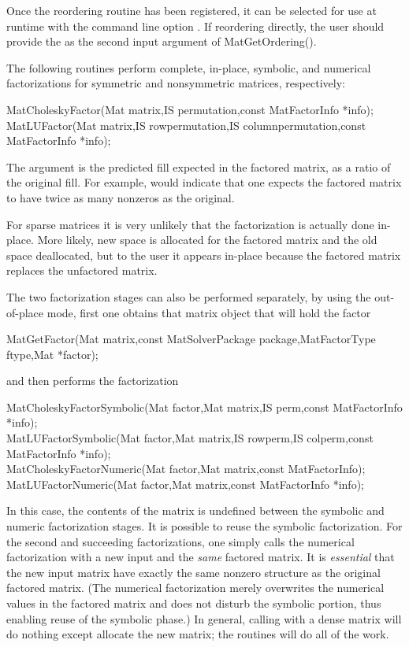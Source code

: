 {{{Once the reordering routine has been registered,
it can be selected for use at runtime with the
command line option  .  If reordering directly,
the user should provide the  as the second input argument of
MatGetOrdering().

The following routines perform complete, in-place, symbolic, and numerical 
factorizations for symmetric and nonsymmetric matrices, respectively:
\begin{tabbing}
  MatCholeskyFactor(Mat matrix,IS permutation,const MatFactorInfo *info);\\
  MatLUFactor(Mat matrix,IS rowpermutation,IS columnpermutation,const MatFactorInfo *info);
\end{tabbing}
The argument  is the predicted fill
expected in the factored matrix, as a ratio of the original fill. 
For example,  would indicate that one expects the factored
matrix to have twice as many nonzeros as the original.

For sparse matrices it is very unlikely that the factorization 
is actually done in-place. More likely, new space is allocated 
for the factored matrix and the old space deallocated, but to the 
user it appears in-place because the factored matrix replaces
the unfactored matrix.

The 
two 
factorization 
stages 
can also be performed separately, by using the out-of-place mode, first
one obtains that matrix object that will hold the factor
\begin{tabbing}
  MatGetFactor(Mat matrix,const MatSolverPackage package,MatFactorType ftype,Mat *factor);
\end{tabbing}
and then performs the factorization
\begin{tabbing}
  MatCholeskyFactorSymbolic(Mat factor,Mat matrix,IS perm,const MatFactorInfo *info);\\
  MatLUFactorSymbolic(Mat factor,Mat matrix,IS rowperm,IS colperm,const MatFactorInfo *info);\\
  MatCholeskyFactorNumeric(Mat factor,Mat matrix,const MatFactorInfo);\\
  MatLUFactorNumeric(Mat factor,Mat matrix,const MatFactorInfo *info);
\end{tabbing}
In this case, the contents of the matrix  is undefined between 
the symbolic and numeric factorization stages. 
It is possible to reuse the symbolic factorization. For the second and 
succeeding factorizations, one simply calls the numerical factorization with a 
new input  and the {\em same} factored  matrix.
It is {\em essential} that the new input matrix 
have   %
exactly the same nonzero structure as the original factored matrix.
(The numerical factorization merely overwrites the numerical values in the 
factored matrix and does not disturb the symbolic portion, thus enabling
reuse of the symbolic phase.)
In general, calling  with a dense matrix will 
do nothing except allocate the new matrix; the  
routines will do all of the work. 

}}}
